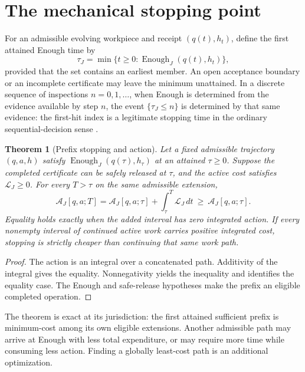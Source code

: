 \documentclass[11pt,letterpaper]{article}
\newtheorem{theorem}{Theorem}
\theoremstyle{definition}\newtheorem{definition}{Definition}
\newcommand{\Enough}{\operatorname{Enough}}
\newcommand{\Act}{\mathcal A}
\newcommand{\Lag}{\mathscr L}
\begin{document}
\section{The mechanical stopping point}
For an admissible evolving workpiece and receipt $(q(t),h_t)$, define the first attained Enough time by
\begin{equation}\label{eq:tau}
\boxed{\tau_J=\min\{t\ge0:\Enough_J(q(t),h_t)\},}
\end{equation}
provided that the set contains an earliest member. An open acceptance boundary or an incomplete certificate may leave the minimum unattained. In a discrete sequence of inspections $n=0,1,\ldots$, when Enough is determined from the evidence available by step $n$, the event $\{\tau_J\le n\}$ is determined by that same evidence: the first-hit index is a legitimate stopping time in the ordinary sequential-decision sense \cite{wald}.

\begin{theorem}[Prefix stopping and action]\label{thm:prefix}
Let a fixed admissible trajectory $(q,a,h)$ satisfy $\Enough_J(q(\tau),h_\tau)$ at an attained $\tau\ge0$. Suppose the completed certificate can be safely released at $\tau$, and the active cost satisfies $\Lag_J\ge0$. For every $T>\tau$ on the same admissible extension,
\begin{equation}\label{eq:prefix}
\boxed{\Act_J[q,a;T]=\Act_J[q,a;\tau]+\int_{\tau}^T\Lag_J\,dt\ \ge\ \Act_J[q,a;\tau].}
\end{equation}
Equality holds exactly when the added interval has zero integrated action. If every nonempty interval of continued active work carries positive integrated cost, stopping is strictly cheaper than continuing that same work path.
\end{theorem}
\begin{proof}
The action is an integral over a concatenated path. Additivity of the integral gives the equality. Nonnegativity yields the inequality and identifies the equality case. The Enough and safe-release hypotheses make the prefix an eligible completed operation.
\end{proof}

The theorem is exact at its jurisdiction: the first attained sufficient prefix is minimum-cost among its own eligible extensions. Another admissible path may arrive at Enough with less total expenditure, or may require more time while consuming less action. Finding a globally least-cost path is an additional optimization.
\end{document}
